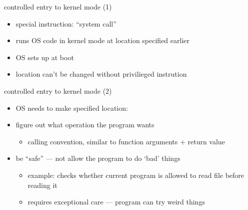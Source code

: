 

\begin{frame}{controlled entry to kernel mode (1)}
\begin{itemize}
\item special instruction: ``system call''
\vspace{.5cm}
\item runs OS code in kernel mode at location specified earlier 
\item OS sets up at boot
\item location can't be changed without privilieged instrution
\end{itemize}
\end{frame}

\begin{frame}{controlled entry to kernel mode (2)}
\begin{itemize}
\item OS needs to make specified location:
\vspace{.5cm}
\item figure out what operation the program wants
    \begin{itemize}
    \item calling convention, similar to function arguments + return value
    \end{itemize}
\item be ``safe'' --- not allow the program to do `bad' things
    \begin{itemize}
    \item example: checks whether current program is allowed to read file before reading it
    \item requires exceptional care --- program can try weird things
    \end{itemize}
\end{itemize}
\end{frame}
